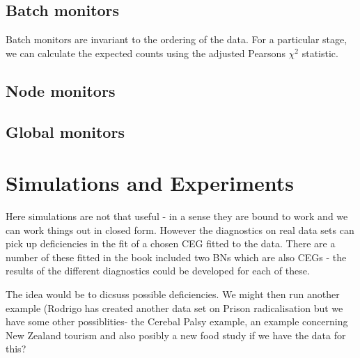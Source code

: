 \documentclass[12pt]{article}
\begin{document}
\subsection{Batch monitors}

Batch monitors are invariant to the ordering of the data. For a particular stage, we can calculate the expected counts using the adjusted Pearsons $\chi^2$ statistic.   

\subsection{Node monitors}

\subsection{Global monitors}

%
%
%

\section{Simulations and Experiments}

Here simulations are not that useful - in a sense they are bound to work and
we can work things out in closed form. However the diagnostics on real data
sets can pick up deficiencies in the fit of a chosen CEG fitted to the data.
There are a number of these fitted in the book included two BNs which are
also CEGs - the results of the different diagnostics could be developed for
each of these. 

The idea would be to dicsuss possible deficiencies. We might
then run another example (Rodrigo has created another data set on Prison
radicalisation but we have some other possiblities- the Cerebal Palsy
example, an example concerning New Zealand tourism and also posibly a new
food study if we have the data for this? 
\end{document}

